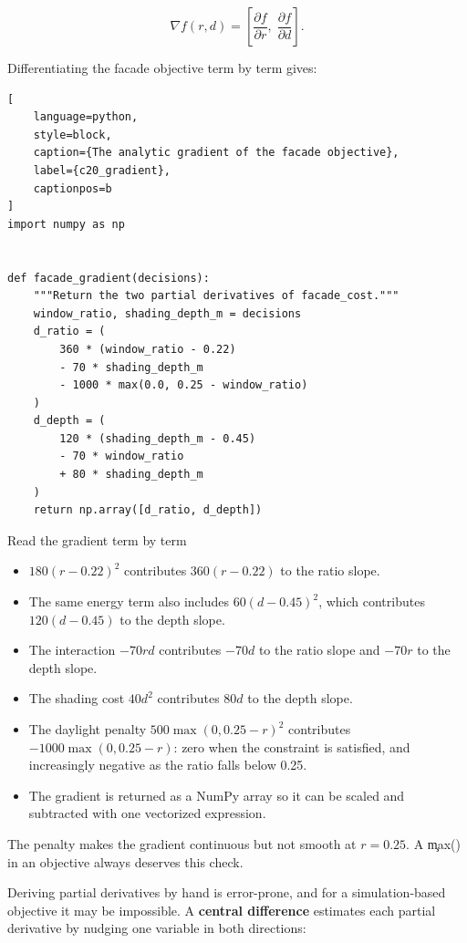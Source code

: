 \[
\nabla f(r, d) = \left[\frac{\partial f}{\partial r},\; \frac{\partial f}{\partial d}\right].
\]

Differentiating the facade objective term by term gives:

\begin{lstlisting}[
    language=python,
    style=block,
    caption={The analytic gradient of the facade objective},
    label={c20_gradient},
    captionpos=b
]
import numpy as np


def facade_gradient(decisions):
    """Return the two partial derivatives of facade_cost."""
    window_ratio, shading_depth_m = decisions
    d_ratio = (
        360 * (window_ratio - 0.22)
        - 70 * shading_depth_m
        - 1000 * max(0.0, 0.25 - window_ratio)
    )
    d_depth = (
        120 * (shading_depth_m - 0.45)
        - 70 * window_ratio
        + 80 * shading_depth_m
    )
    return np.array([d_ratio, d_depth])
\end{lstlisting}

\begin{SyntaxBox}{Read the gradient term by term}
\begin{itemize}
    \item $180(r-0.22)^2$ contributes $360(r-0.22)$ to the ratio slope.
    \item The same energy term also includes $60(d-0.45)^2$, which contributes
          $120(d-0.45)$ to the depth slope.
    \item The interaction $-70rd$ contributes $-70d$ to the ratio slope and
          $-70r$ to the depth slope.
    \item The shading cost $40d^2$ contributes $80d$ to the depth slope.
    \item The daylight penalty $500\max(0, 0.25-r)^2$ contributes
          $-1000\max(0, 0.25-r)$: zero when the constraint is satisfied, and
          increasingly negative as the ratio falls below 0.25.
    \item The gradient is returned as a NumPy array so it can be scaled and
          subtracted with one vectorized expression.
\end{itemize}
The penalty makes the gradient continuous but not smooth at $r = 0.25$. A
\c{max()} in an objective always deserves this check.
\end{SyntaxBox}


Deriving partial derivatives by hand is error-prone, and for a simulation-based
objective it may be impossible. A \textbf{central difference} estimates each
partial derivative by nudging one variable in both directions:

